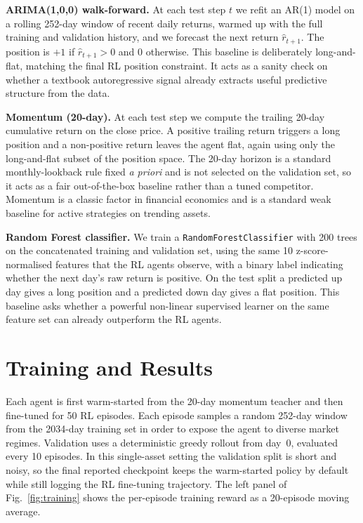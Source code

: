 \documentclass[11pt,twocolumn]{article}
\begin{document}
\textbf{ARIMA(1,0,0) walk-forward.}
At each test step $t$ we refit an AR(1) model on a rolling 252-day window of recent daily returns, warmed up with the full training and validation history, and we forecast the next return $\hat{r}_{t+1}$. The position is $+1$ if $\hat{r}_{t+1} > 0$ and $0$ otherwise. This baseline is deliberately long-and-flat, matching the final RL position constraint. It acts as a sanity check on whether a textbook autoregressive signal already extracts useful predictive structure from the data.

\textbf{Momentum (20-day).}
At each test step we compute the trailing 20-day cumulative return on the close price. A positive trailing return triggers a long position and a non-positive return leaves the agent flat, again using only the long-and-flat subset of the position space. The 20-day horizon is a standard monthly-lookback rule fixed \emph{a priori} and is not selected on the validation set, so it acts as a fair out-of-the-box baseline rather than a tuned competitor. Momentum is a classic factor in financial economics and is a standard weak baseline for active strategies on trending assets.

\textbf{Random Forest classifier.}
We train a \texttt{RandomForestClassifier} with 200 trees on the concatenated training and validation set, using the same 10 z-score-normalised features that the RL agents observe, with a binary label indicating whether the next day's raw return is positive. On the test split a predicted up day gives a long position and a predicted down day gives a flat position. This baseline asks whether a powerful non-linear supervised learner on the same feature set can already outperform the RL agents.

\section{Training and Results}

Each agent is first warm-started from the 20-day momentum teacher and then fine-tuned for 50 RL episodes. Each episode samples a random 252-day window from the 2034-day training set in order to expose the agent to diverse market regimes. Validation uses a deterministic greedy rollout from day~0, evaluated every 10 episodes. In this single-asset setting the validation split is short and noisy, so the final reported checkpoint keeps the warm-started policy by default while still logging the RL fine-tuning trajectory. The left panel of Fig.~\ref{fig:training} shows the per-episode training reward as a 20-episode moving average.
\end{document}
